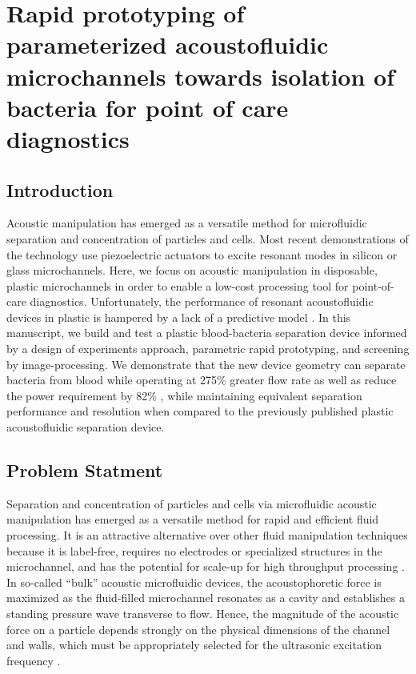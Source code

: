 \chapter{Rapid prototyping of parameterized acoustofluidic microchannels towards isolation of bacteria for point of care diagnostics}
\label{chapter:acoust}
\thispagestyle{myheadings}

\graphicspath{{4_acoust/Figures/}}

\section{Introduction}
\label{sec:acoust_intro}
Acoustic manipulation has emerged as a versatile method for microfluidic separation and concentration of particles and cells. Most recent demonstrations of the technology use piezoelectric actuators to excite resonant modes in silicon or glass microchannels. Here, we focus on acoustic manipulation in disposable, plastic microchannels in order to enable a low-cost processing tool for point-of-care diagnostics. Unfortunately, the performance of resonant acoustofluidic devices in plastic is hampered by a lack of a predictive model . In this manuscript, we build and test a plastic blood-bacteria separation device informed by a design of experiments approach, parametric rapid prototyping, and screening by image-processing. We demonstrate that the new device geometry can separate bacteria from blood while operating at 275\% greater flow rate as well as reduce the power requirement by 82\% , while maintaining equivalent separation performance and resolution when compared to the previously published plastic acoustofluidic separation device. 

\section{Problem Statment}
\label{sec:acoust_ps}
Separation and concentration of particles and cells via microfluidic acoustic manipulation has emerged as a versatile method for rapid and efficient fluid processing. It is an attractive alternative over other fluid manipulation techniques because it is label-free, requires no electrodes or specialized structures in the microchannel, and has the potential for scale-up for high throughput processing \cite{antfolk2017continuous}\cite{bhagat2010microfluidics}. In so-called ``bulk'' acoustic microfluidic devices, the acoustophoretic force is maximized  as the fluid-filled microchannel resonates as a cavity and establishes a standing pressure wave transverse to flow.  Hence, the magnitude of the acoustic force on a particle depends strongly on the physical dimensions of the channel and walls, which must be appropriately selected for the ultrasonic excitation frequency \cite{bruus2012acoustofluidics}. 

